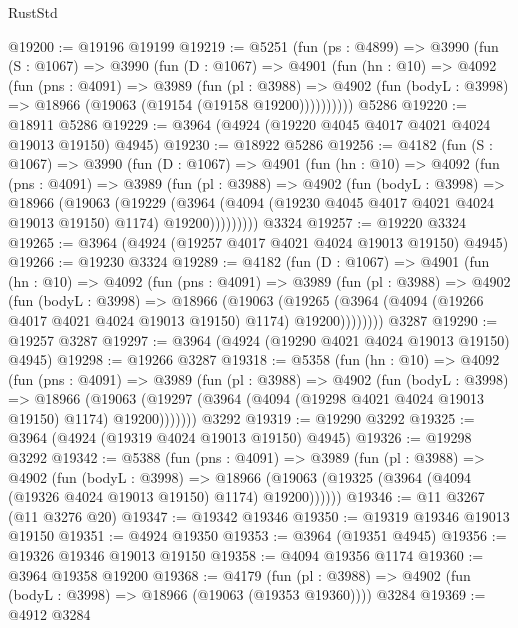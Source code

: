 \begin{lexlean}{RustStd}
\begin{coremodule}
{\begin{coremodule}
{{{{{{{{{{{{{{{{{{{{{{{{{{{{{{{{{{{{{{@19200 := @19196 @19199
@19219 := @5251
    (fun (ps : @4899) =>
    @3990
      (fun (S : @1067) =>
      @3990
        (fun (D : @1067) =>
        @4901
          (fun (hn : @10) =>
          @4092
            (fun (pns : @4091) =>
            @3989
              (fun (pl : @3988) =>
              @4902 (fun (bodyL : @3998) => @18966 (@19063 (@19154 (@19158 @19200))))))))))
    @5286
@19220 := @18911 @5286
@19229 := @3964 (@4924 (@19220 @4045 @4017 @4021 @4024 @19013 @19150) @4945)
@19230 := @18922 @5286
@19256 := @4182
    (fun (S : @1067) =>
    @3990
      (fun (D : @1067) =>
      @4901
        (fun (hn : @10) =>
        @4092
          (fun (pns : @4091) =>
          @3989
            (fun (pl : @3988) =>
            @4902
              (fun (bodyL : @3998) =>
              @18966
                (@19063
                  (@19229
                    (@3964
                      (@4094 (@19230 @4045 @4017 @4021 @4024 @19013 @19150) @1174)
                      @19200)))))))))
    @3324
@19257 := @19220 @3324
@19265 := @3964 (@4924 (@19257 @4017 @4021 @4024 @19013 @19150) @4945)
@19266 := @19230 @3324
@19289 := @4182
    (fun (D : @1067) =>
    @4901
      (fun (hn : @10) =>
      @4092
        (fun (pns : @4091) =>
        @3989
          (fun (pl : @3988) =>
          @4902
            (fun (bodyL : @3998) =>
            @18966
              (@19063
                (@19265 (@3964 (@4094 (@19266 @4017 @4021 @4024 @19013 @19150) @1174) @19200))))))))
    @3287
@19290 := @19257 @3287
@19297 := @3964 (@4924 (@19290 @4021 @4024 @19013 @19150) @4945)
@19298 := @19266 @3287
@19318 := @5358
    (fun (hn : @10) =>
    @4092
      (fun (pns : @4091) =>
      @3989
        (fun (pl : @3988) =>
        @4902
          (fun (bodyL : @3998) =>
          @18966
            (@19063 (@19297 (@3964 (@4094 (@19298 @4021 @4024 @19013 @19150) @1174) @19200)))))))
    @3292
@19319 := @19290 @3292
@19325 := @3964 (@4924 (@19319 @4024 @19013 @19150) @4945)
@19326 := @19298 @3292
@19342 := @5388
    (fun (pns : @4091) =>
    @3989
      (fun (pl : @3988) =>
      @4902
        (fun (bodyL : @3998) =>
        @18966 (@19063 (@19325 (@3964 (@4094 (@19326 @4024 @19013 @19150) @1174) @19200))))))
@19346 := @11 @3267 (@11 @3276 @20)
@19347 := @19342 @19346
@19350 := @19319 @19346 @19013 @19150
@19351 := @4924 @19350
@19353 := @3964 (@19351 @4945)
@19356 := @19326 @19346 @19013 @19150
@19358 := @4094 @19356 @1174
@19360 := @3964 @19358 @19200
@19368 := @4179
    (fun (pl : @3988) => @4902 (fun (bodyL : @3998) => @18966 (@19063 (@19353 @19360))))
    @3284
@19369 := @4912 @3284
}}}}}}}}}}}}}}}}}}}}}}}}}}}}}}}}}}}}}}
\end{coremodule}}
\end{coremodule}
\end{lexlean}
